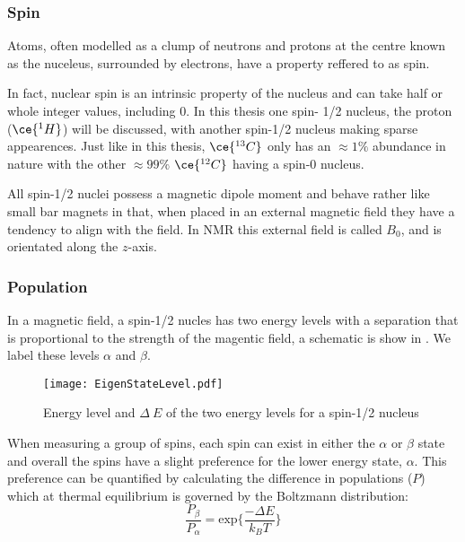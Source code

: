 \subsubsection{Spin}

Atoms, often modelled as a clump of neutrons and protons at
the centre known as the nuceleus, surrounded by electrons, have a property reffered to as spin.

In fact, nuclear spin is an intrinsic property of the nucleus and can take half or whole
integer values, including $0$. In this thesis one spin- 1/2 nucleus, the proton ($\ce{^{1}H}$) will be discussed, with another spin-1/2 nucleus  making
sparse appearences. Just like in this thesis, $\ce{^{13}C}$ only has an $\approx{1}\%$
abundance in nature with the other $\approx{99}\%$ $\ce{^{12}C}$ having a spin-$0$
nucleus.

All spin-1/2 nuclei possess a magnetic dipole moment and behave rather like small bar magnets in that, when placed in an external magnetic field they have a tendency to align
with the field. In NMR this external field is called $B_0$, and is orientated along the
$z$-axis.

\subsubsection{Population}\label{Population}

In a magnetic field, a spin-1/2 nucles has two energy levels with a separation that is proportional to the strength of the magentic field, a schematic is show in . We label these levels $\alpha$ and $\beta$.

\begin{figure}
  \begin{center}
  \texttt{[image: EigenStateLevel.pdf]}
  \end{center}
  \caption{Energy level and $\Delta~E$ of the two energy levels for a spin-1/2 nucleus}
  \label{fig:EnergySplit}
\end{figure}

When measuring a group of spins, each spin can exist in either the $\alpha$ or $\beta$ state and overall
the spins have a slight preference for the lower energy state, $\alpha$. This preference can be quantified
by calculating the difference in populations ($P$) which at thermal equilibrium is governed by the
Boltzmann distribution:
\begin{equation}\label{eqn:Boltzmann}
  \frac{P_{\beta}}{P_{\alpha}} = \text{exp}\{\frac{-\Delta{E}}{k_B T}\}
\end{equation}

